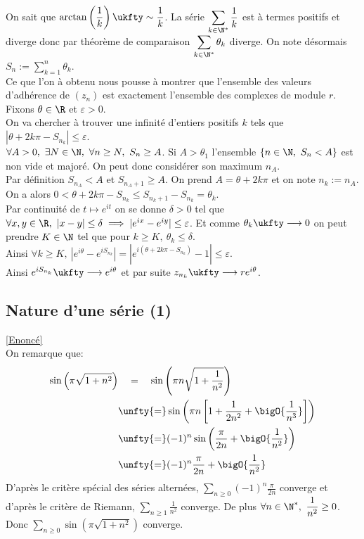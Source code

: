 \documentclass{book}
\begin{document}
\begin{enumerate}[leftmargin=*]
		On sait que $\displaystyle\arctan\left(\frac{1}{k}\right)\ukfty\sim\frac{1}{k}$. La série $\displaystyle\sum_{k\in \N^*}\frac{1}{k}$ est à termes positifs et diverge donc par théorème de comparaison $\displaystyle\sum_{k\in \N^*}\theta_k$ diverge. On note désormais $S_n:=\displaystyle\sum_{k=1}^n\theta_k$.\\
		Ce que l'on à obtenu nous pousse à montrer que l'ensemble des valeurs d'adhérence de $(z_n)$ est exactement l'ensemble des complexes de module $r$. Fixons $\theta\in\R$ et $\varepsilon>0$.\\
		On va chercher à trouver une infinité d'entiers positifs $k$ tels que $|\theta+2k\pi-S_{n_k}|\leq \varepsilon$.\\
		$\forall A>0,\ \exists N\in \N,\ \forall n\geq N,\ S_n\geq A$. Si $A>\theta_1$ l'ensemble $\{n\in \N,\ S_n<A\}$ est non vide et majoré. On peut donc considérer son maximum $n_A$.\\
		Par définition $S_{n_A}<A$ et $S_{n_A+1}\geq A$. On prend $A=\theta+2k\pi$ et on note $n_k:=n_A$.\\
		On a alors $0<\theta+2k\pi-S_{n_k}\leq S_{n_k+1}-S_{n_k}=\theta_k$.\\
		Par continuité de $t\mapsto e^{it}$ on se donne $\delta>0$ tel que $\forall x,y\in \R,\ |x-y|\leq \delta\implies |e^{ix}-e^{iy}|\leq \varepsilon$. Et comme $\theta_k\ukfty\longrightarrow 0$ on peut prendre $K\in \N$ tel que pour $k\geq K,\ \theta_k\leq \delta$.\\
		Ainsi $\forall k\geq K,\ |e^{i\theta}-e^{iS_{n_k}}|=|e^{i(\theta+2k\pi-S_{n_k})}-1|\leq \varepsilon$.\\
		Ainsi $e^{iS_{n_k}}\ukfty\longrightarrow e^{i\theta}$ et par suite $z_{n_k}\ukfty\longrightarrow re^{i\theta}$.
	\end{enumerate}
	
	\subsection{Nature d'une série (1) }
	\label{Nature d'une série (1) corrigé}
	\textcolor{blue}{\hyperref[Nature d'une série (1)]{[Enoncé]}}\\
	On remarque que: \begin{align*}
		\sin\left(\pi\sqrt{1+n^2}\right)&\ \ \ =\ \ \ \sin\left(\pi n\sqrt{1+\frac{1}{n^2}}\right)\\
		&\unfty{=}\sin\left(\pi n\left[1+\frac{1}{2n^2}+\bigO{\frac{1}{n^3}}\right]\right)\\
		&\unfty{=}(-1)^n\sin\left(\frac{\pi}{2n}+\bigO{\frac{1}{n^2}}\right)\\
		&\unfty{=}(-1)^n\frac{\pi}{2n}+\bigO{\frac{1}{n^2}}
	\end{align*}
	D'après le critère spécial des séries alternées, $\displaystyle\sum\limits_{n\geq 0}(-1)^n\frac{\pi}{2n}$ converge et d'après le critère de Riemann, $\displaystyle\sum_{n\geq 1}\frac{1}{n^2}$ converge. De plus $\forall n\in \N^*,\ \displaystyle\frac{1}{n^2}\geq 0$.
	\\Donc $\displaystyle\sum\limits_{n\geq 0}\sin(\pi\sqrt{1+n^2})$ converge.
	
\end{document}
